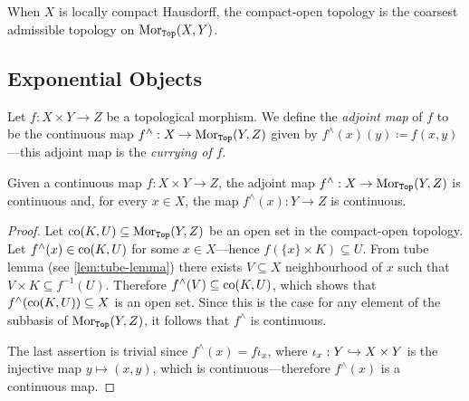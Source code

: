 \begin{corollary}
    \label{cor:cpct-open-is-coarsest-admissible}
    When \(X\) is locally compact Hausdorff, the compact-open topology is the
    coarsest admissible topology on \(\operatorname{Mor}_{{\texttt{Top}}}(X, Y)\).
\end{corollary}

\subsection{Exponential Objects}

\begin{definition}
    \label{def:adjoint-map-top}
    Let \(f: X \times Y \to Z\) be a topological morphism. We define the
    \emph{adjoint map} of \(f\) to be the continuous map \(f^{\wedge}: X \to
    \operatorname{Mor}_{{\texttt{Top}}}(Y, Z)\) given by \(f^{\wedge}(x)(y) \coloneq f(x, y)\)---this
    adjoint map is the \emph{currying of \(f\)}.
\end{definition}

\begin{proposition}
    \label{prop:adjoint-map-is-continuous}
    Given a continuous map \(f: X \times Y \to Z\), the adjoint map
    \(f^{\wedge}: X \to \operatorname{Mor}_{{\texttt{Top}}}(Y, Z)\) is continuous and, for every
    \(x \in X\), the map \(f^{\wedge}(x): Y \to Z\) is continuous.
\end{proposition}

\begin{proof}
    Let \(\operatorname{co}(K, U) \subseteq \operatorname{Mor}_{{\texttt{Top}}}(Y, Z)\) be an open set in the compact-open
    topology. Let \(f^{\wedge}(x) \in \operatorname{co}(K, U)\) for some \(x \in X\)---hence
    \(f(\{x\} \times K) \subseteq U\). From tube lemma (see \cref{lem:tube-lemma})
    there exists \(V \subseteq X\) neighbourhood of \(x\) such that \(V \times K
    \subseteq f^{-1}(U)\). Therefore \(f^{\wedge}(V) \subseteq \operatorname{co}(K, U)\), which
    shows that \(f^{\wedge}(\operatorname{co}(K, U)) \subseteq X\) is an open set. Since this is the
    case for any element of the subbasis of \(\operatorname{Mor}_{{\texttt{Top}}}(Y, Z)\), it follows that
    \(f^{\wedge}\) is continuous.

    The last assertion is trivial since \(f^{\wedge}(x) = f \iota_x\), where
    \(\iota_x: Y \hookrightarrow X \times Y\) is the injective map \(y \mapsto (x, y)\), which
    is continuous---therefore \(f^{\wedge}(x)\) is a continuous map.
\end{proof}

